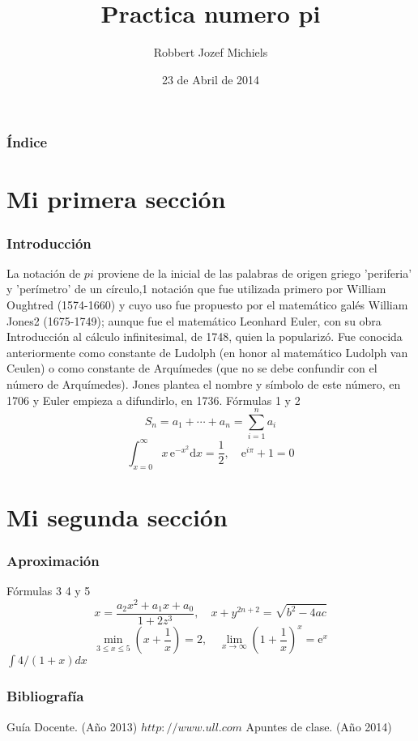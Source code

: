 \documentclass{beamer}
\title[Problemas]{Practica numero pi}
\author[Robbert]{Robbert Jozef Michiels}
\date[23.04.14]{23 de Abril de 2014}
\begin{document}
\begin{frame}
\titlepage
\end{frame}

\begin{frame}
\frametitle{Índice}
\tableofcontents[pausesections]
\end{frame}

\section{Mi primera sección}
\begin{frame}
\frametitle{Introducción}
La notación de $pi$ proviene de la inicial de las palabras de origen griego 'periferia' y 'perímetro' de un círculo,1 notación que fue utilizada primero por William Oughtred (1574-1660) y cuyo uso fue propuesto por el matemático galés William Jones2 (1675-1749); aunque fue el matemático Leonhard Euler, con su obra Introducción al cálculo infinitesimal, de 1748, quien la popularizó. Fue conocida anteriormente como constante de Ludolph (en honor al matemático Ludolph van Ceulen) o como constante de Arquímedes (que no se debe confundir con el número de Arquímedes). Jones plantea el nombre y símbolo de este número, en 1706 y Euler empieza a difundirlo, en 1736.
Fórmulas 1 y 2
\[ S_n=a_1+\cdots + a_n = \sum_{i=1}^n a_i \]
\[\int_{x=0}^{\infty} x\,\text{e}^{-x^2}\text{d}x=\frac{1}{2},\quad\text{e}^{i\pi}+1=0 \]
\end{frame}

\section{Mi segunda sección}
\begin{frame}
\frametitle{Aproximación}
Fórmulas 3 4 y 5
\[x=\frac{a_2 x^2 + a_1 x + a_0}{1+2z^3}, \quad x+y^{2n+2}=\sqrt{b^2-4ac}\]
\[\min_{3\le x\le 5}\left(x+\frac{1}{x}\right)=2,\quad \lim_{x\to\infty} \left(1+\frac{1}{x}\right)^x = \text{e}^x \]
$\int 4/(1+x) dx$
\end{frame}

\begin{frame}
\frametitle{Bibliografía}
\begin{thebibliography}
\beamertermplatebookbibitems
{}
  Guía Docente. (Año 2013)
  {\small $http://www.ull.com$}
  Apuntes de clase. (Año 2014)
\end{thebibliography}
\end{frame}
\end{document}
